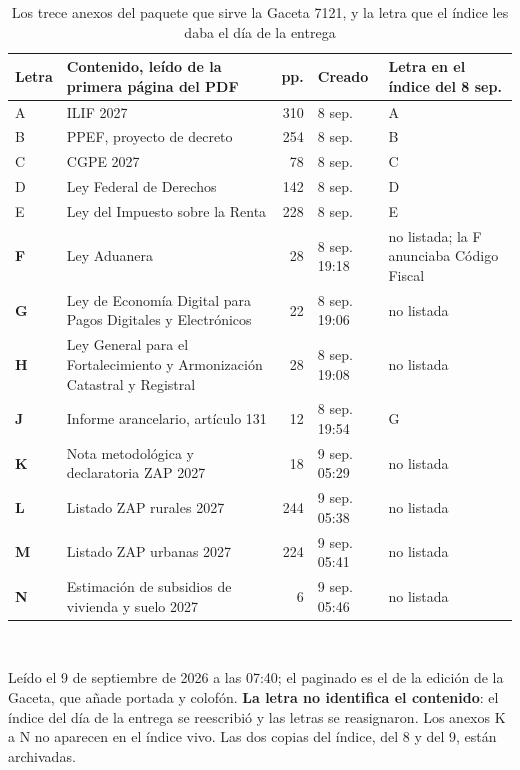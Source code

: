 \begin{table}[htbp]\centering\footnotesize
\caption{Los trece anexos del paquete que sirve la Gaceta 7121, y la letra que el índice les daba el día de la entrega}\label{cua:anexos}
\begin{tabular}{l>{\raggedright\arraybackslash}p{5.0cm}rl>{\raggedright\arraybackslash}p{2.9cm}}
\toprule
Letra & Contenido, leído de la primera página del PDF & pp. & Creado & Letra en el índice del 8 sep. \\
\midrule
A & ILIF 2027 & 310 & 8 sep. & A \\
B & PPEF, proyecto de decreto & 254 & 8 sep. & B \\
C & CGPE 2027 & 78 & 8 sep. & C \\
D & Ley Federal de Derechos & 142 & 8 sep. & D \\
E & Ley del Impuesto sobre la Renta & 228 & 8 sep. & E \\
\textbf{F} & Ley Aduanera & 28 & 8 sep. 19:18 & no listada; la F anunciaba Código Fiscal \\
\textbf{G} & Ley de Economía Digital para Pagos Digitales y Electrónicos & 22 & 8 sep. 19:06 & no listada \\
\textbf{H} & Ley General para el Fortalecimiento y Armonización Catastral y Registral & 28 & 8 sep. 19:08 & no listada \\
\textbf{J} & Informe arancelario, artículo 131 & 12 & 8 sep. 19:54 & G \\
\textbf{K} & Nota metodológica y declaratoria ZAP 2027 & 18 & 9 sep. 05:29 & no listada \\
\textbf{L} & Listado ZAP rurales 2027 & 244 & 9 sep. 05:38 & no listada \\
\textbf{M} & Listado ZAP urbanas 2027 & 224 & 9 sep. 05:41 & no listada \\
\textbf{N} & Estimación de subsidios de vivienda y suelo 2027 & 6 & 9 sep. 05:46 & no listada \\
\bottomrule
\end{tabular}
\\[2pt]\begin{minipage}{0.92\textwidth}\scriptsize Leído el 9 de septiembre de 2026 a las 07:40; el paginado es el de la edición de la Gaceta, que añade portada y colofón. \textbf{La letra no identifica el contenido}: el índice del día de la entrega se reescribió y las letras se reasignaron. Los anexos K a N no aparecen en el índice vivo. Las dos copias del índice, del 8 y del 9, están archivadas.\end{minipage}
\end{table}
